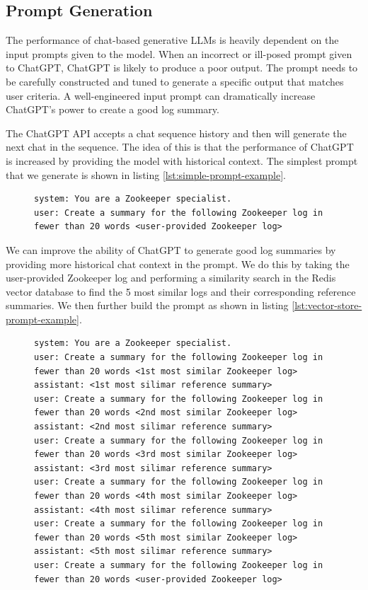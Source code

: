 \documentclass[conference]{IEEEtran}
\begin{document}
\subsection{Prompt Generation} \label{subsec:promptgeneration}

The performance of chat-based generative LLMs is heavily dependent on the input prompts given to the model. When an incorrect or ill-posed prompt given to ChatGPT, ChatGPT is likely to produce a poor output. The prompt needs to be carefully constructed and tuned to generate a specific output that matches user criteria. A well-engineered input prompt can dramatically increase ChatGPT's power to create a good log summary.

The ChatGPT API accepts a chat sequence history and then will generate the next chat in the sequence. The idea of this is that the performance of ChatGPT is increased by providing the model with historical context. The simplest prompt that we generate is shown in listing \ref{lst:simple-prompt-example}.

\begin{figure}[ht]
\begin{lstlisting}[numbers=none, caption=Simple Prompt Template Example, label={lst:simple-prompt-example}]
system: You are a Zookeeper specialist.
user: Create a summary for the following Zookeeper log in fewer than 20 words <user-provided Zookeeper log>
\end{lstlisting}
\end{figure}

We can improve the ability of ChatGPT to generate good log summaries by providing more historical chat context in the prompt. We do this by taking the user-provided Zookeeper log and performing a similarity search in the Redis vector database to find the 5 most similar logs and their corresponding reference summaries. We then further build the prompt as shown in listing \ref{lst:vector-store-prompt-example}.

\begin{figure}[ht]
\begin{lstlisting}[numbers=none, caption=Prompt with Similar Logs Template Example, label={lst:vector-store-prompt-example}]
system: You are a Zookeeper specialist.
user: Create a summary for the following Zookeeper log in fewer than 20 words <1st most similar Zookeeper log>
assistant: <1st most silimar reference summary>
user: Create a summary for the following Zookeeper log in fewer than 20 words <2nd most similar Zookeeper log>
assistant: <2nd most silimar reference summary>
user: Create a summary for the following Zookeeper log in fewer than 20 words <3rd most similar Zookeeper log>
assistant: <3rd most silimar reference summary>
user: Create a summary for the following Zookeeper log in fewer than 20 words <4th most similar Zookeeper log>
assistant: <4th most silimar reference summary>
user: Create a summary for the following Zookeeper log in fewer than 20 words <5th most similar Zookeeper log>
assistant: <5th most silimar reference summary>
user: Create a summary for the following Zookeeper log in fewer than 20 words <user-provided Zookeeper log>
\end{lstlisting}
\end{figure}
\end{document}
